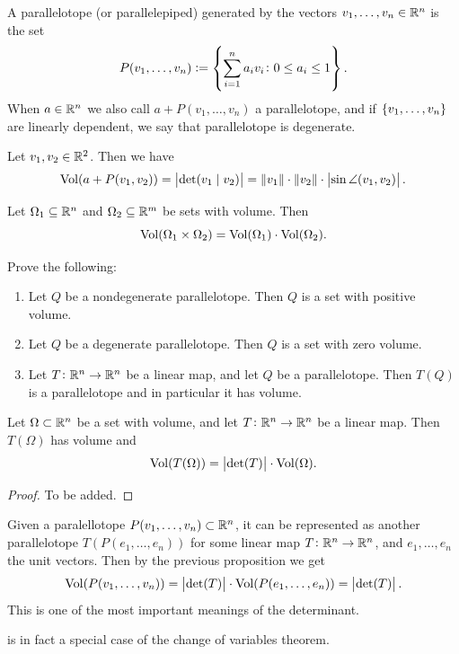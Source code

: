 \documentclass[11pt,a4paper]{article}
\begin{document}
\begin{definition}[Parallelotope]
  A parallelotope (or parallelepiped) generated by the vectors
  $v_1,\dots,v_n \in \mathbb{R}^n$ is the set
  \[
    P(v_1,\dots,v_n) := \left\{\sum_{i=1}^{n} a_i v_i \colon 0 \le a_i \le 1\right\}.
  \]
  When $a \in \mathbb{R}^n$ we also call $a + P(v_1,\dots,v_n)$ a parallelotope,
  and if $\left\{v_1,\dots,v_n\right\}$ are linearly dependent, we say that
  parallelotope is degenerate.
\end{definition}
\begin{exercise}
  Let $v_1,v_2 \in \mathbb{R}^2$.
  Then we have
  \[
    \operatorname{Vol}(a + P(v_1,v_2)) =
    \left\lvert\det(v_1 \mid v_2)\right\rvert =
    \left\lVert v_1\right\rVert \cdot \left\lVert v_2\right\rVert \cdot \left\lvert\sin\angle(v_1,v_2)\right\rvert.
  \]
\end{exercise}
\begin{exercise}
  Let $\Omega_1 \subseteq \mathbb{R}^n$ and $\Omega_2 \subseteq \mathbb{R}^m$ be sets
  with volume.
  Then
  \[
    \operatorname{Vol}(\Omega_1 \times \Omega_2) = \operatorname{Vol}(\Omega_1) \cdot \operatorname{Vol}(\Omega_2).
  \]
\end{exercise}
\begin{exercise}
  Prove the following:
  \begin{enumerate}
    \item[(1)] Let $Q$ be a nondegenerate parallelotope.
      Then $Q$ is a set with positive volume.
    \item[(2)] Let $Q$ be a degenerate parallelotope.
      Then $Q$ is a set with zero volume.
    \item[(3)] Let $T \colon \mathbb{R}^n \to \mathbb{R}^n$ be a linear map,
      and let $Q$ be a parallelotope.
      Then $T(Q)$ is a parallelotope and in particular it has volume.
  \end{enumerate}
\end{exercise}
\begin{proposition}
  \label{prop:det-vol-relationship}
  Let $\Omega \subset \mathbb{R}^n$ be a set with volume,
  and let $T \colon \mathbb{R}^n \to \mathbb{R}^n$ be a linear map.
  Then $T(\Omega)$ has volume and
  \[
    \operatorname{Vol}(T(\Omega)) = \left\lvert\det(T)\right\rvert \cdot \operatorname{Vol}(\Omega).
  \]
\end{proposition}
\begin{proof}
  To be added.
\end{proof}
\begin{remark}
  \label{rem:det-is-partop-volume}
  Given a paralellotope $P(v_1,\dots,v_n) \subset \mathbb{R}^n$,
  it can be represented as another parallelotope
  $T(P(e_1,\dots,e_n))$ for some linear
  map $T \colon \mathbb{R}^n \to \mathbb{R}^n$, and $e_1,\dots,e_n$ the unit vectors.
  Then by the previous proposition we get
  \[
    \operatorname{Vol}(P(v_1,\dots,v_n)) =
    \left\lvert\det(T)\right\rvert \cdot \operatorname{Vol}(P(e_1,\dots,e_n)) =
    \left\lvert\det(T)\right\rvert.
  \]
  This is one of the most important meanings of the determinant.
\end{remark}
\begin{remark}
   is in fact a special case of the
  change of variables theorem.
\end{remark}
\end{document}
